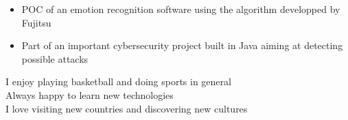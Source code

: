 \documentclass[10pt,a4paper,ragged2e]{altacv}
\begin{document}




\begin{itemize}
	\item POC of an emotion recognition software using the algorithm developped by Fujitsu
\end{itemize}
\divider
{}
\begin{itemize}
	\item Part of an important cybersecurity project built in Java aiming at detecting possible attacks
\end{itemize}

\medskip

	\cvtag{\faHeartbeat} I enjoy playing basketball and doing sports in general \\
	\cvtag{\faChevronUp} Always happy to learn new technologies \\
	\cvtag{\faPlane} I love visiting new countries and discovering new cultures

\end{document}
